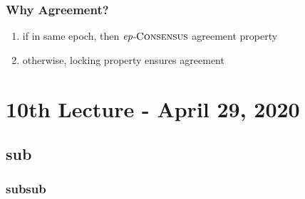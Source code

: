 \documentclass{article}
\begin{document}
\begin{adjustwidth}{2em}{2em}
			\subsubsection{Why Agreement?}
			\begin{adjustwidth}{2em}{}
				\begin{enumerate}[-]
					\item if in same epoch, then $\textit{ep-}\textsc{Consensus}$ agreement property
					\item otherwise, locking property ensures agreement
				\end{enumerate}
		\end{adjustwidth}
	\end{adjustwidth}
	
	\newpage
	
	\section{10th Lecture - April 29, 2020}
	\begin{adjustwidth}{2em}{2em}
		\subsection{sub}
		\begin{adjustwidth}{2em}{2em}
			\subsubsection{subsub}
			\begin{adjustwidth}{2em}{}
			\end{adjustwidth}
		\end{adjustwidth}
	\end{adjustwidth}
	
	\newpage
	
\end{document}
